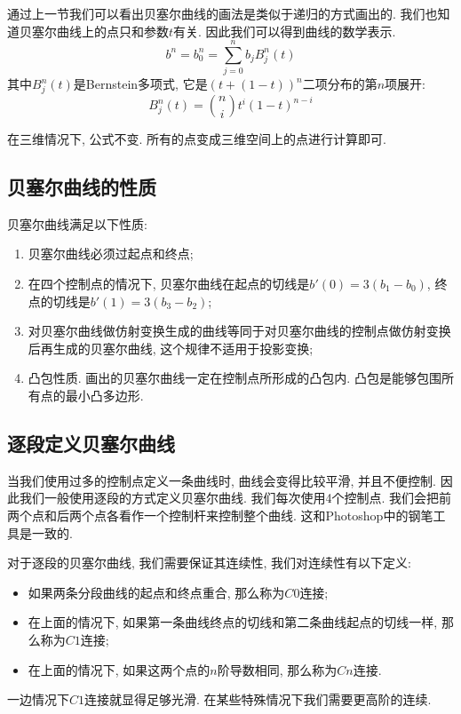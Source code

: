 通过上一节我们可以看出贝塞尔曲线的画法是类似于递归的方式画出的. 我们也知道贝塞尔曲线上的点只和参数$t$有关. 因此我们可以得到曲线的数学表示. 
\begin{equation}
	b^n=b_0^n=\sum_{j=0}^nb_jB_j^n(t)
\end{equation}
其中$B_j^n(t)$是Bernstein多项式, 它是$(t+(1-t))^n$二项分布的第$n$项展开: 
\begin{equation}
	B_j^n(t)=\binom{n}{i}t^i(1-t)^{n-i}
\end{equation}

在三维情况下, 公式不变. 所有的点变成三维空间上的点进行计算即可. 

\subsection{贝塞尔曲线的性质}
贝塞尔曲线满足以下性质: 
\begin{enumerate}
	\item 贝塞尔曲线必须过起点和终点; 
	\item 在四个控制点的情况下, 贝塞尔曲线在起点的切线是$b'(0)=3(b_1-b_0)$, 终点的切线是$b'(1)=3(b_3-b_2)$; 
	\item 对贝塞尔曲线做仿射变换生成的曲线等同于对贝塞尔曲线的控制点做仿射变换后再生成的贝塞尔曲线, 这个规律不适用于投影变换; 
	\item 凸包性质. 画出的贝塞尔曲线一定在控制点所形成的凸包内. 凸包是能够包围所有点的最小凸多边形. 
\end{enumerate}

\subsection{逐段定义贝塞尔曲线}
当我们使用过多的控制点定义一条曲线时, 曲线会变得比较平滑, 并且不便控制. 因此我们一般使用逐段的方式定义贝塞尔曲线. 我们每次使用4个控制点. 我们会把前两个点和后两个点各看作一个控制杆来控制整个曲线. 这和Photoshop中的钢笔工具是一致的. 

对于逐段的贝塞尔曲线, 我们需要保证其连续性, 我们对连续性有以下定义: 
\begin{itemize}
	\item 如果两条分段曲线的起点和终点重合, 那么称为$C0$连接; 
	\item 在上面的情况下, 如果第一条曲线终点的切线和第二条曲线起点的切线一样, 那么称为$C1$连接; 
	\item 在上面的情况下, 如果这两个点的$n$阶导数相同, 那么称为$Cn$连接. 
\end{itemize}
一边情况下$C1$连接就显得足够光滑. 在某些特殊情况下我们需要更高阶的连续. 

